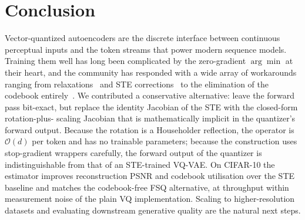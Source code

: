 \section{Conclusion}
\label{sec:conclusion}

Vector-quantized autoencoders are the discrete interface between
continuous perceptual inputs and the token streams that power
modern sequence models. Training them well has long been
complicated by the zero-gradient $\arg\min$ at their heart, and the
community has responded with a wide array of workarounds ranging
from relaxations~\citep{jang2017gumbel,maddison2017concrete} and
STE corrections~\citep{huh2023straighteningste,
shah2024decoupledste} to the elimination of the codebook
entirely~\citep{mentzer2024fsq}. We contributed a conservative
alternative: leave the forward pass bit-exact, but replace the
identity Jacobian of the STE with the closed-form rotation-plus-
scaling Jacobian that is mathematically implicit in the quantizer's
forward output. Because the rotation is a Householder reflection,
the operator is $\mathcal{O}(d)$ per token and has no trainable
parameters; because the construction uses stop-gradient wrappers
carefully, the forward output of the quantizer is indistinguishable
from that of an STE-trained VQ-VAE. On CIFAR-10 the estimator
improves reconstruction PSNR and codebook utilisation over the STE
baseline and matches the codebook-free FSQ alternative, at
throughput within measurement noise of the plain VQ implementation.
Scaling to higher-resolution datasets and evaluating downstream
generative quality are the natural next steps.
